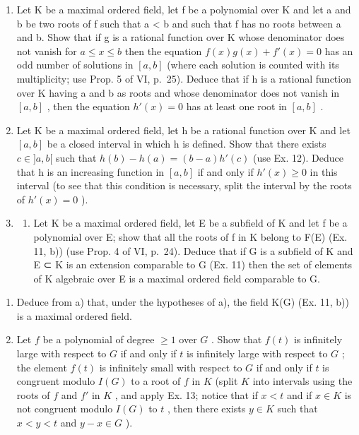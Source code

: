 \begin{enumerate}
\def\labelenumi{\arabic{enumi})}
\setcounter{enumi}{11}
\item
  Let K be a maximal ordered field, let f be a polynomial over K and let a and b be two roots of f such that a \textless{} b and such that f has no roots between a and b. Show that if g is a rational function over K whose denominator does not vanish for \(a \leqslant x \leqslant b\) then the equation \(f(x)g(x) + f'(x) = 0\) has an odd number of solutions in \([a, b]\) (where each solution is counted with its multiplicity; use Prop. 5 of VI, p.~25). Deduce that if h is a rational function over K having a and b as roots and whose denominator does not vanish in \([a, b]\) , then the equation \(h'(x) = 0\) has at least one root in \([a, b]\) .
\item
  Let K be a maximal ordered field, let h be a rational function over K and let \([a, b]\) be a closed interval in which h is defined. Show that there exists \(c \in ]a, b[\) such that \(h(b) - h(a) = (b - a)h'(c)\) (use Ex. 12). Deduce that h is an increasing function in \([a, b]\) if and only if \(h'(x) \geqslant 0\) in this interval (to see that this condition is necessary, split the interval by the roots of \(h'(x) = 0\) ).
\item
  \begin{enumerate}
  \def\labelenumii{\alph{enumii})}
  \tightlist
  \item
    Let K be a maximal ordered field, let E be a subfield of K and let f be a polynomial over E; show that all the roots of f in K belong to F(E) (Ex. 11, b)) (use Prop. 4 of VI, p.~24). Deduce that if G is a subfield of K and E ⊂ K is an extension comparable to G (Ex. 11) then the set of elements of K algebraic over E is a maximal ordered field comparable to G.
  \end{enumerate}
\end{enumerate}

\begin{enumerate}
\def\labelenumi{\alph{enumi})}
\setcounter{enumi}{1}
\item
  Deduce from a) that, under the hypotheses of a), the field K(G) (Ex. 11, b)) is a maximal ordered field.
\item
  Let \(f\) be a polynomial of degree \(\geqslant 1\) over \(G\) . Show that \(f(t)\) is infinitely large with respect to \(G\) if and only if \(t\) is infinitely large with respect to \(G\) ; the element \(f(t)\) is infinitely small with respect to \(G\) if and only if \(t\) is congruent modulo \(I(G)\) to a root of \(f\) in \(K\) (split \(K\) into intervals using the roots of \(f\) and \(f'\) in \(K\) , and apply Ex. 13; notice that if \(x < t\) and if \(x \in K\) is not congruent modulo \(I(G)\) to \(t\) , then there exists \(y \in K\) such that \(x < y < t\) and \(y - x \in G\) ).
\end{enumerate}

